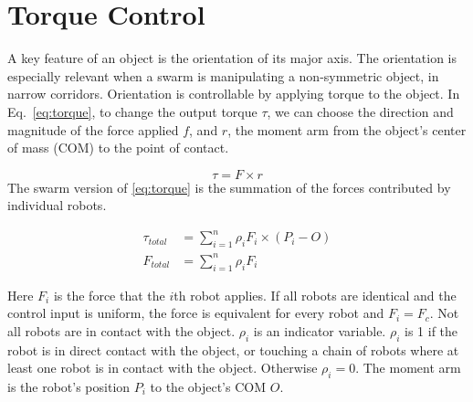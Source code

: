 \section{Torque Control}
\label{sec:theory}

A key feature of an object is the orientation of its major axis. 
The orientation is especially relevant when a swarm is manipulating a non-symmetric object, in narrow corridors. 
Orientation is controllable by applying torque to the object. 
In Eq.~\ref{eq:torque},  to change the output torque $\tau$, we can choose the direction and magnitude of the force applied $f$, and $r$, the moment arm from the object's center of mass (COM) to the point of contact.

\begin{equation}
\tau = F \times r\label{eq:torque}
\end{equation}
The swarm version of \eqref{eq:torque} is the summation of the forces contributed by individual robots.

\begin{align}
\tau_{total} &= \sum\limits_{i=1}^n \rho_i F_i \times (P_i - O )   \label{eq:swarmtorque}\\
F_{total} &= \sum\limits_{i=1}^n \rho_i F_i  \label{eq:swarmforce}
\end{align}

Here $F_i$ is the force that the $i$th robot applies.  If all robots are identical and the control input is uniform, the force is equivalent for every robot and $F_i = F_c$.
Not all robots are in contact with the object.  $\rho_i$ is an indicator variable.   $\rho_i$ is 1 if the robot is in direct contact with the object, or touching a chain of robots where at least one robot is in contact with the object. Otherwise $\rho_i = 0$.
The moment arm is the robot's position $P_i$ to the object's COM $O$.




